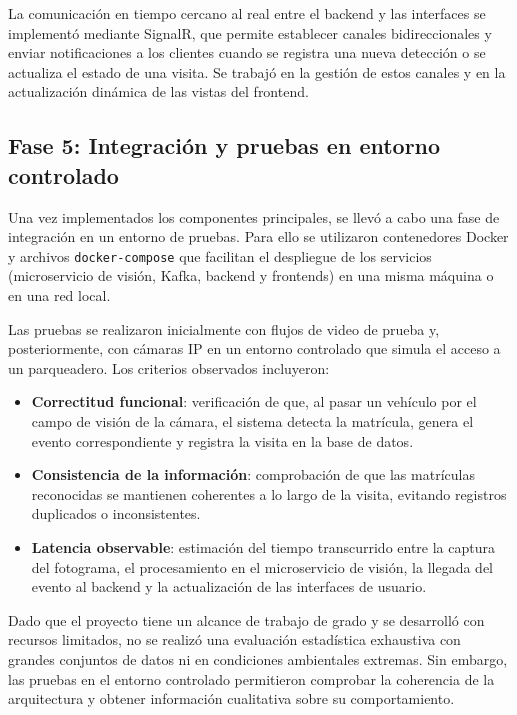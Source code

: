 La comunicación en tiempo cercano al real entre el backend y las interfaces se implementó mediante SignalR, que permite establecer canales bidireccionales y enviar notificaciones a los clientes cuando se registra una nueva detección o se actualiza el estado de una visita. Se trabajó en la gestión de estos canales y en la actualización dinámica de las vistas del frontend.

\subsection{Fase 5: Integración y pruebas en entorno controlado}

Una vez implementados los componentes principales, se llevó a cabo una fase de integración en un entorno de pruebas. Para ello se utilizaron contenedores Docker y archivos \texttt{docker-compose} que facilitan el despliegue de los servicios (microservicio de visión, Kafka, backend y frontends) en una misma máquina o en una red local.

Las pruebas se realizaron inicialmente con flujos de video de prueba y, posteriormente, con cámaras IP en un entorno controlado que simula el acceso a un parqueadero. Los criterios observados incluyeron:

\begin{itemize}
    \item \textbf{Correctitud funcional}: verificación de que, al pasar un vehículo por el campo de visión de la cámara, el sistema detecta la matrícula, genera el evento correspondiente y registra la visita en la base de datos.
    \item \textbf{Consistencia de la información}: comprobación de que las matrículas reconocidas se mantienen coherentes a lo largo de la visita, evitando registros duplicados o inconsistentes.
    \item \textbf{Latencia observable}: estimación del tiempo transcurrido entre la captura del fotograma, el procesamiento en el microservicio de visión, la llegada del evento al backend y la actualización de las interfaces de usuario.
\end{itemize}

Dado que el proyecto tiene un alcance de trabajo de grado y se desarrolló con recursos limitados, no se realizó una evaluación estadística exhaustiva con grandes conjuntos de datos ni en condiciones ambientales extremas. Sin embargo, las pruebas en el entorno controlado permitieron comprobar la coherencia de la arquitectura y obtener información cualitativa sobre su comportamiento.


